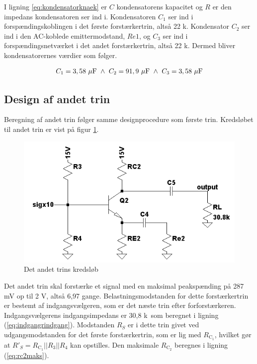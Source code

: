 I ligning \ref{eq:kondensatorknaek} er $C$ kondensatorens kapacitet og $R$ er den impedans kondensatoren ser ind i. Kondensatoren $C_1$ ser ind i forspændingskoblingen i det første forstærkertrin, altså 22 k\ohm. Kondensator $C_2$ ser ind i den AC-koblede emittermodstand, $Re1$, og $C_3$ ser ind i forspændingsnetværket i det andet forstærkertrin, altså 22 k\ohm. Dermed bliver kondensatorernes værdier som følger.

\begin{equation}
C_1=3,58~\mathrm{\mu F}~\wedge ~C_2=91,9~\mathrm{\mu F}~\wedge ~C_3=3,58~\mathrm{\mu F}
\end{equation}



\subsection*{Design af andet trin}
Beregning af andet trin følger samme designprocedure som første trin. Kredsløbet til andet trin er vist på figur \ref{fig:andettrinkreds}.

\begin{figure}[h]
\centering
\includegraphics[scale=.6]{teknisk/forforstaerker/andettrinkreds.png}
\caption{Det andet trins kredsløb}
\label{fig:andettrinkreds}
\end{figure}

Det andet trin skal forstærke et signal med en maksimal peakspænding på 287 mV op til 2 V, altså 6,97 gange. Belastningsmodstanden for dette forstærkertrin er bestemt af indgangsvælgeren, som er det næste trin efter forforstærkeren. Indgangsvælgerens indgangsimpedans er 30,8 k\ohm~som beregnet i ligning (\ref{eq:indgangrindgang}). Modstanden $R_S$ er i dette trin givet ved udgangsmodstanden for det første forstærkertrin, som er lig med $R_{\mathrm{C_1}}$, hvilket gør at $R'_S = R_{\mathrm{C_1}} || R_3 || R_4$ kan opstilles. Den maksimale $R_{\mathrm{C_2}}$ beregnes i ligning (\ref{eq:rc2maks}).

